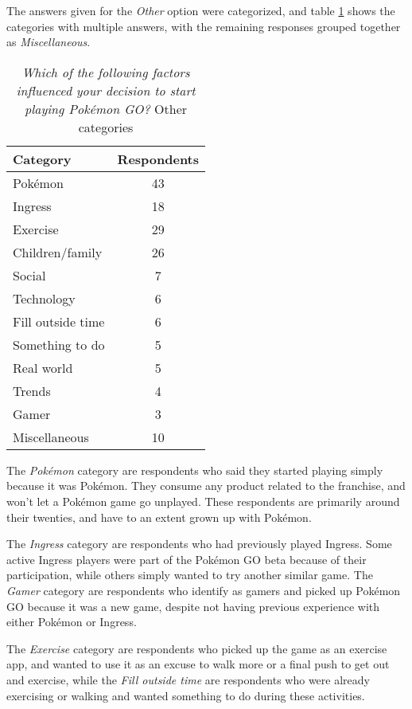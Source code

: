The answers given for the \emph{Other} option were categorized, and table \ref{tbl:initial-interest-other-categories} shows the categories with multiple answers, with the remaining responses grouped together as \emph{Miscellaneous}.

\begin{table}[h]
	\caption{\emph{Which of the following factors influenced your decision to start playing Pokémon GO?} Other categories}
	\centering
	\label{tbl:initial-interest-other-categories}
	\begin{tabular}{|l|c|}
		\hline
		\textbf{Category} & \textbf{Respondents}\\
		\hline\hline
		Pokémon & 43\\\hline
		Ingress & 18\\\hline
		Exercise & 29\\\hline
		Children/family & 26\\\hline
		Social & 7\\\hline
		Technology & 6\\\hline
		Fill outside time & 6\\\hline
		Something to do & 5\\\hline
		Real world & 5\\\hline
		Trends & 4\\\hline
		Gamer & 3\\\hline
		Miscellaneous & 10\\\hline
	\end{tabular}
\end{table}

The \emph{Pokémon} category are respondents who said they started playing simply because it was Pokémon. They consume any product related to the franchise, and won't let a Pokémon game go unplayed. These respondents are primarily around their twenties, and have to an extent grown up with Pokémon.

The \emph{Ingress} category are respondents who had previously played Ingress. Some active Ingress players were part of the Pokémon GO beta because of their participation, while others simply wanted to try another similar game. The \emph{Gamer} category are respondents who identify as gamers and picked up Pokémon GO because it was a new game, despite not having previous experience with either Pokémon or Ingress.

The \emph{Exercise} category are respondents who picked up the game as an exercise app, and wanted to use it as an excuse to walk more or a final push to get out and exercise, while the \emph{Fill outside time} are respondents who were already exercising or walking and wanted something to do during these activities.

